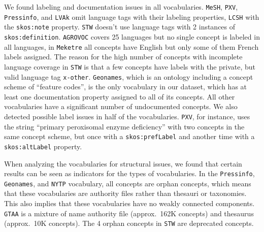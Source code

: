 We found labeling and documentation issues in all vocabularies.
\texttt{MeSH}, \texttt{PXV}, \texttt{Pressinfo}, and \texttt{LVAk} omit language tags with their labeling properties, \texttt{LCSH} with the \texttt{skos:note} property. \texttt{STW} doesn't use language tags with 2 instances of \texttt{skos:definition}.
\texttt{AGROVOC} covers 25 languages but no single concept is labeled in all languages, in \texttt{Meketre} all concepts have English but only some of them French labels assigned. The reason for the high number of concepts with incomplete language coverage in \texttt{STW} is that a few concepts have labels with the private, but valid language tag \texttt{x-other}. 
\texttt{Geonames}, which is an ontology including a concept scheme of ``feature codes'', is the only vocabulary in our dataset, which has at least one documentation property assigned to all of its concepts. All other vocabularies have a significant number of undocumented concepts.
We also detected possible label issues in half of the vocabularies. \texttt{PXV}, for instance, uses the string ``primary peroxisomal enzyme deficiency'' with two concepts in the same concept scheme, but once with a \texttt{skos:prefLabel} and another time with a \texttt{skos:altLabel} property.

When analyzing the vocabularies for structural issues, we found that certain results can be seen as indicators for the types of vocabularies.
In the \texttt{Pressinfo}, \texttt{Geonames}, and \texttt{NYTP} vocabulary, all concepts are orphan concepts, which means that these vocabularies are authority files rather than thesauri or taxonomies. This also implies that these vocabularies have no weakly connected components. \texttt{GTAA} is a mixture of name authority file (approx.~162K concepts) and thesaurus (approx.~10K concepts). The 4 orphan concepts in \texttt{STW} are deprecated concepts.


